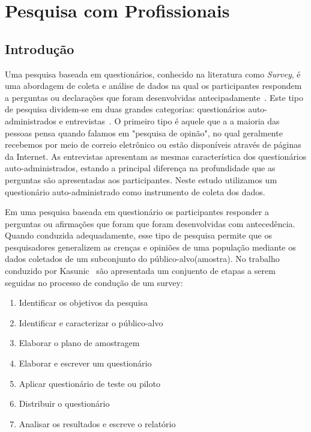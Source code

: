 \chapter{Pesquisa com Profissionais}
\label{ch:pesquisa-profissionais}

\section{Introdução}
\label{sec:pesquisa-profissionais-intro}

Uma pesquisa baseada em questionários, conhecido na literatura como
\textit{Survey}, é uma abordagem de coleta e análise de dados na qual os
participantes respondem a perguntas ou declarações que foram desenvolvidas
antecipadamente~\cite{kasunic2005designing}. Este tipo de pesquisa
dividem-se em duas grandes categorias: questionários auto-administrados e
entrevistas~\cite{kasunic2005designing}. O primeiro tipo é aquele que a a
maioria das pessoas pensa quando falamos em "pesquisa de opinão", no qual
geralmente recebemos por meio de correio eletrônico ou estão disponíveis através
de páginas da Internet. As entrevistas apresentam as mesmas característica dos
questionários auto-administrados, estando a principal diferença na profundidade
que as perguntas são apresentadas aos participantes.  Neste estudo utilizamos
um questionário auto-administrado como instrumento de coleta dos dados.

Em uma pesquisa baseada em questionário os participantes responder a perguntas
ou afirmações que foram que foram desenvolvidas com antecedência. Quando
conduzida adequadamente, esse tipo de pesquisa permite que os pesquisadores
generalizem as crenças e opiniões de uma população mediante os dados
coletados de um subconjunto do público-alvo(amostra). No trabalho conduzido por
Kasunic~\cite{kasunic2005designing} são apresentada um conjuento de etapas a
serem seguidas no processo de condução de um survey:

\begin{enumerate}
\item{Identificar os objetivos da pesquisa}
\item{Identificar e caracterizar o público-alvo}
\item{Elaborar o plano de amostragem}
\item{Elaborar e escrever um questionário}
\item{Aplicar questionário de teste ou piloto}
\item{Distribuir o questionário}
\item{Analisar os resultados e escreve o relatório}
\end{enumerate}

